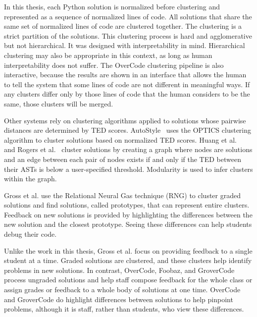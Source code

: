 In this thesis, each Python solution is normalized before clustering and represented as a sequence of normalized lines of code. All solutions that share the same set of normalized lines of code are clustered together. The clustering is a strict partition of the solutions. This clustering process is hard and agglomerative but not hierarchical. It was designed with interpretability in mind. Hierarchical clustering may also be appropriate in this context, as long as human interpretability does not suffer. The OverCode clustering pipeline is also interactive, because the results are shown in an interface that allows the human to tell the system that some lines of code are not different in meaningful ways. If any clusters differ only by those lines of code that the human considers to be the same, those clusters will be merged.

Other systems rely on clustering algorithms applied to solutions whose pairwise distances are determined by TED scores. AutoStyle~\cite{choudhury2016autostyle} uses the OPTICS clustering algorithm to cluster solutions based on normalized TED scores. Huang et al.~\cite{MOOCshop} and Rogers et al.~\cite{ACESthesis} cluster solutions by creating a graph where nodes are solutions and an edge between each pair of nodes exists if and only if the TED between their ASTs is below a user-specified threshold. Modularity is used to infer clusters within the graph. 

Gross et al. \cite{gross} use the Relational Neural Gas technique (RNG) to cluster graded solutions and find solutions, called prototypes, that can represent entire clusters. Feedback on new solutions is provided by highlighting the differences between the new solution and the closest prototype. Seeing these differences can help students debug their code. 

Unlike the work in this thesis, Gross et al. focus on providing feedback to a single student at a time. Graded solutions are clustered, and these clusters help identify problems in new solutions. In contrast, OverCode, Foobaz, and GroverCode process ungraded solutions and help staff compose feedback for the whole class or assign grades or feedback to a whole body of solutions at one time. OverCode and GroverCode do highlight differences between solutions to help pinpoint problems, although it is staff, rather than students, who view these differences.

